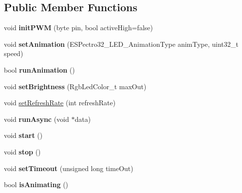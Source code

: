 \subsection*{Public Member Functions}
\begin{DoxyCompactItemize}
\item 
\hypertarget{classESPectro32__LED__Animator_a1dd78181b03d945041fdff57a77be3ba}{void {\bfseries init\-P\-W\-M} (byte pin, bool active\-High=false)}\label{classESPectro32__LED__Animator_a1dd78181b03d945041fdff57a77be3ba}

\item 
\hypertarget{classESPectro32__LED__Animator_a6ac0439b588360c898495b5a9922da13}{void {\bfseries set\-Animation} (E\-S\-Pectro32\-\_\-\-L\-E\-D\-\_\-\-Animation\-Type anim\-Type, uint32\-\_\-t speed)}\label{classESPectro32__LED__Animator_a6ac0439b588360c898495b5a9922da13}

\item 
\hypertarget{classESPectro32__LED__Animator_a4c6d8ac33ea56caf25989d9c0e4947a9}{bool {\bfseries run\-Animation} ()}\label{classESPectro32__LED__Animator_a4c6d8ac33ea56caf25989d9c0e4947a9}

\item 
\hypertarget{classESPectro32__LED__Animator_a3c1960b72ab66707137cfaca9dc1032d}{void {\bfseries set\-Brightness} (Rgb\-Led\-Color\-\_\-t max\-Out)}\label{classESPectro32__LED__Animator_a3c1960b72ab66707137cfaca9dc1032d}

\item 
void \hyperlink{classESPectro32__LED__Animator_acd696eea5a2982cf557706e9ea3ff0f6}{set\-Refresh\-Rate} (int refresh\-Rate)
\item 
\hypertarget{classESPectro32__LED__Animator_a4456c2b42e75121d256d856a6b482e72}{void {\bfseries run\-Async} (void $\ast$data)}\label{classESPectro32__LED__Animator_a4456c2b42e75121d256d856a6b482e72}

\item 
\hypertarget{classESPectro32__LED__Animator_a8f15c42dbd9232a36a841df15c624f56}{void {\bfseries start} ()}\label{classESPectro32__LED__Animator_a8f15c42dbd9232a36a841df15c624f56}

\item 
\hypertarget{classESPectro32__LED__Animator_aa82ac7f49d0ead5ed78a03b11e1a4d6d}{void {\bfseries stop} ()}\label{classESPectro32__LED__Animator_aa82ac7f49d0ead5ed78a03b11e1a4d6d}

\item 
\hypertarget{classESPectro32__LED__Animator_a98d875c4f6edffab25c18863237b5893}{void {\bfseries set\-Timeout} (unsigned long time\-Out)}\label{classESPectro32__LED__Animator_a98d875c4f6edffab25c18863237b5893}

\item 
\hypertarget{classESPectro32__LED__Animator_a1f5697a61b99a467a67091410e847d2e}{bool {\bfseries is\-Animating} ()}\label{classESPectro32__LED__Animator_a1f5697a61b99a467a67091410e847d2e}

\end{DoxyCompactItemize}


